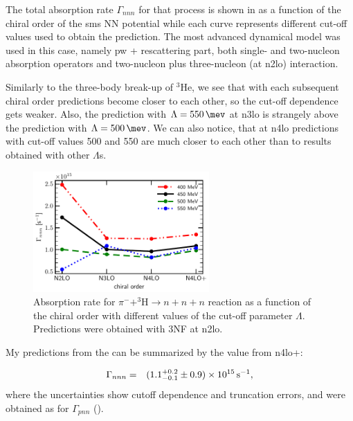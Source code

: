     The total absorption rate $\Gamma_{nnn}$ for that process is shown in 
    as a function of the chiral order of the \gls{sms} NN potential while each curve represents
    different cut-off values used to obtain the prediction. 
    The most advanced dynamical model was used in this case, namely \gls{pw} + rescattering part,
    both single- and two-nucleon absorption operators and two-nucleon plus three-nucleon (at \gls{n2lo}) interaction.

    Similarly to the three-body break-up of $^3$He, we see that with each subsequent chiral order
    predictions become closer to each other, so the cut-off dependence gets weaker.
    Also, the prediction with $\Lambda=\SI{550}{\mev}$ at \gls{n3lo} is
    strangely above the prediction with $\Lambda=\SI{500}{\mev}$.
    We can also notice, that at \gls{n4lo}
    predictions with cut-off values \SI{500}{\mev} and \SI{550}{\mev}
    are much closer to each other than to results obtained with other $\Lambda$s.

    \begin{figure}[h]
        \begin{center}
        \includegraphics[width=0.6\textwidth]{PlotData/PION/Dalitz_maps/figures/Gamma_nnn.pdf}
        \end{center}
        \caption{Absorption rate for $\pi^- + ^3\text{H} \rightarrow n + n + n$ reaction as a function
        of the chiral order with different values of the cut-off parameter $\Lambda$.
        Predictions were obtained with 3NF at \gls{n2lo}.}
        \label{Gamma_nnn}
    \end{figure}

    My predictions from the  can be summarized by the value from \gls{n4lo+}:

    \begin{eqnarray}\label{Gam_nnn_our}
        \Gamma_{nnn}  & =& (1.1^{+ 0.2}_{-0.1} \pm 0.9)\times 10^{15} \, {\rm s^{-1}},
    \end{eqnarray}
    where the uncertainties show cutoff dependence and truncation errors,
    and were obtained as for $\Gamma_{pnn}$ ().

